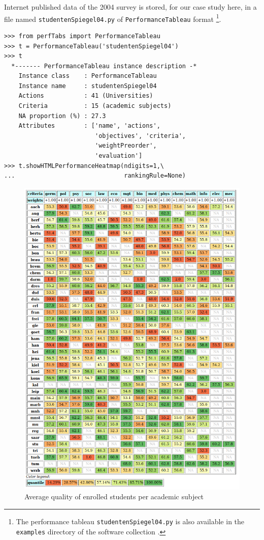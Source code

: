 Internet published data of the 2004 survey is stored, for our case study here, in a file named \texttt{studentenSpiegel04.py} of \texttt{PerformanceTableau} format \footnote{The performance tableau \texttt{studentenSpiegel04.py} is also available in the \texttt{examples} directory of the \Digraph software collection \citep{BIS-2021}.}.
\begin{lstlisting}[caption={The 2004 Spiegel students survey data},label=list:14.1]
>>> from perfTabs import PerformanceTableau
>>> t = PerformanceTableau('studentenSpiegel04')
>>> t
  *------- PerformanceTableau instance description -*
    Instance class    : PerformanceTableau
    Instance name     : studentenSpiegel04
    Actions           : 41 (Universities)
    Criteria          : 15 (academic subjects)
    NA proportion (%) : 27.3
    Attributes        : ['name', 'actions',
                         'objectives', 'criteria',
                         'weightPreorder',
                         'evaluation']
>>> t.showHTMLPerformanceHeatmap(ndigits=1,\
...                              rankingRule=None)
\end{lstlisting}
\begin{figure}[ht]
\includegraphics[width=\hsize]{Figures/14-1-ratingData.png}
\caption{Average quality of enrolled students per academic subject}
\label{fig:14.1}       %
\end{figure}

